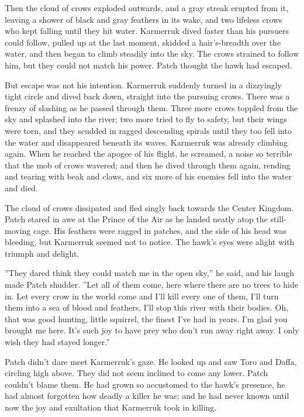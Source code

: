 \documentclass[11pt]{article}
\begin{document}
 Then the cloud of crows exploded outwards, and a gray streak erupted from it, leaving a shower of black and gray feathers in its wake, and two lifeless crows who kept falling until they hit water. Karmerruk dived faster than his pursuers could follow, pulled up at the last moment, skidded a hair's-breadth over the water, and then began to climb steadily into the sky. The crows strained to follow him, but they could not match his power. Patch thought the hawk had escaped.\par
 But escape was not his intention. Karmerruk suddenly turned in a dizzyingly tight circle and dived back down, straight into the pursuing crows. There was a frenzy of slashing as he passed through them. Three more crows toppled from the sky and splashed into the river; two more tried to fly to safety, but their wings were torn, and they scudded in ragged descending spirals until they too fell into the water and disappeared beneath its waves. Karmerruk was already climbing again. When he reached the apogee of his flight, he screamed, a noise so terrible that the mob of crows wavered; and then he dived through them again, rending and tearing with beak and claws, and six more of his enemies fell into the water and died. \par
The cloud of crows dissipated and fled singly back towards the Center Kingdom. Patch stared in awe at the Prince of the Air as he landed neatly atop the still-moving cage. His feathers were ragged in patches, and the side of his head was bleeding, but Karmerruk seemed not to notice. The hawk's eyes were alight with triumph and delight.\par
 ''They dared think they could match me in the open sky,'' he said, and his laugh made Patch shudder. ''Let all of them come, here where there are no trees to hide in. Let every crow in the world come and I'll kill every one of them, I'll turn them into a sea of blood and feathers, I'll stop this river with their bodies. Oh, that was good hunting, little squirrel, the finest I've had in years. I'm glad you brought me here. It's such joy to have prey who don't run away right away. I only wish they had stayed longer.''\par
 Patch didn't dare meet Karmerruk's gaze. He looked up and saw Toro and Daffa, circling high above. They did not seem inclined to come any lower. Patch couldn't blame them. He had grown so accustomed to the hawk's presence, he had almost forgotten how deadly a killer he was; and he had never known until now the joy and exultation that Karmerruk took in killing.\par
\end{document}
